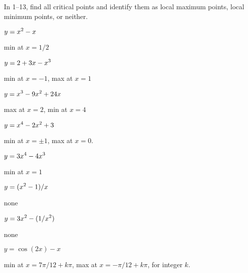 \begin{exercises}
In 1--13,
find all critical points and identify them as
local maximum points, local minimum points, or neither.

\twocol

\begin{exercise} $\displaystyle y=x^2-x$ 
\begin{answer} min at $x=1/2$
\end{answer}\end{exercise}

\begin{exercise} $\displaystyle y=2+3x-x^3$ 
\begin{answer} min at $x=-1$, max at $x=1$
\end{answer}\end{exercise}

\begin{exercise} $\displaystyle y=x^3-9x^2+24x$
\begin{answer} max at $x=2$, min at $x=4$
\end{answer}\end{exercise}

\begin{exercise} $\displaystyle y=x^4-2x^2+3$ 
\begin{answer} min at $x=\pm 1$, max at $x=0$.
\end{answer}\end{exercise}

\begin{exercise} $\displaystyle y=3x^4-4x^3$
\begin{answer} min at $x=1$
\end{answer}\end{exercise}

\begin{exercise} $\displaystyle y=(x^2-1)/x$
\begin{answer} none
\end{answer}\end{exercise}

\begin{exercise} $\displaystyle y=3x^2-(1/x^2)$ 
\begin{answer} none
\end{answer}\end{exercise}

\begin{exercise} $y=\cos(2x)-x$ 
\begin{answer} min at $x=7\pi/12+k\pi$, max at $x=-\pi/12+k\pi$, for integer $k$.
\end{answer}\end{exercise}


\end{exercises}
